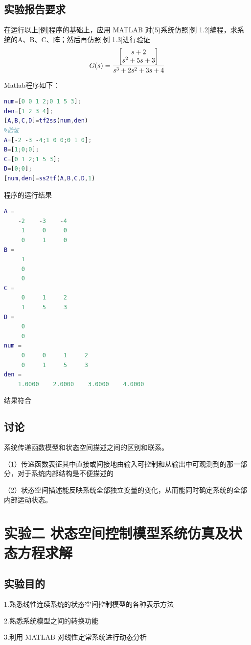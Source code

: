 \documentclass[UTF8]{ctexart}
\begin{document}
\subsection{ 实验报告要求 }
\par 在运行以上[例]程序的基础上，应用 MATLAB 对(5)系统仿照[例 1.2]编程，求系统的A、B、C、阵；然后再仿照[例 1.3]进行验证
\begin{equation}
G(s)= \frac {\begin{bmatrix}s+2\\s^{2}+5s+3\\\end{bmatrix}}{s^{3}+2s^{2}+3s+4} \\
\end{equation}
\par Matlab程序如下：
\par  \begin{lstlisting}[language=matlab,escapeinside=``]
% %% 实验1应用
num=[0 0 1 2;0 1 5 3];
den=[1 2 3 4];
[A,B,C,D]=tf2ss(num,den)
%验证
A=[-2 -3 -4;1 0 0;0 1 0];
B=[1;0;0];
C=[0 1 2;1 5 3];
D=[0;0];
[num,den]=ss2tf(A,B,C,D,1)
\end{lstlisting}
\par 程序的运行结果
\par  \begin{lstlisting}[language=matlab,escapeinside=``]
A =
    -2    -3    -4
     1     0     0
     0     1     0
B =
     1
     0
     0
C =
     0     1     2
     1     5     3
D =
     0
     0
num =
     0     0     1     2
     0     1     5     3
den =
    1.0000    2.0000    3.0000    4.0000
\end{lstlisting}
\par 结果符合
\subsection{ 讨论 }
\par 系统传递函数模型和状态空间描述之间的区别和联系。
\par （1）传递函数表征其中直接或间接地由输入可控制和从输出中可观测到的那一部分，对于系统内部结构是不便描述的
\par（2）状态空间描述能反映系统全部独立变量的变化，从而能同时确定系统的全部内部运动状态。

\newpage
\section{实验二 \quad 状态空间控制模型系统仿真及状态方程求解 }
\subsection{ 实验目的 }
\par 1.熟悉线性连续系统的状态空间控制模型的各种表示方法 
\par 2.熟悉系统模型之间的转换功能
\par 3.利用 MATLAB 对线性定常系统进行动态分析
\end{document}
